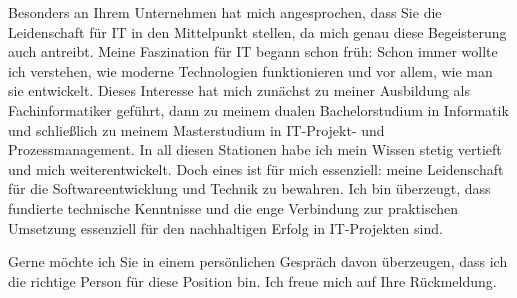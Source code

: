 \documentclass[11pt, a4paper]{awesome-cv}
\begin{document}
\begin{cvletter}
  Besonders an Ihrem Unternehmen hat mich angesprochen, dass Sie die Leidenschaft für IT in den Mittelpunkt stellen, da mich genau diese Begeisterung auch antreibt. Meine Faszination für IT begann schon früh: Schon immer wollte ich verstehen, wie moderne Technologien funktionieren und vor allem, wie man sie entwickelt. Dieses Interesse hat mich zunächst zu meiner Ausbildung als Fachinformatiker geführt, dann zu meinem dualen Bachelorstudium in Informatik und schließlich zu meinem Masterstudium in IT-Projekt- und Prozessmanagement. In all diesen Stationen habe ich mein Wissen stetig vertieft und mich weiterentwickelt. Doch eines ist für mich essenziell: meine Leidenschaft für die Softwareentwicklung und Technik zu bewahren. Ich bin überzeugt, dass fundierte technische Kenntnisse und die enge Verbindung zur praktischen Umsetzung essenziell für den nachhaltigen Erfolg in IT-Projekten sind.
  
  Gerne möchte ich Sie in einem persönlichen Gespräch davon überzeugen, dass ich die richtige Person für diese Position bin. Ich freue mich auf Ihre Rückmeldung.

\end{cvletter}


\makeletterclosing
\end{document}
